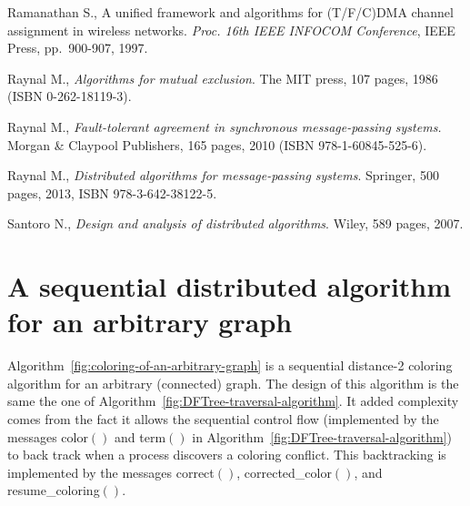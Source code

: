\documentclass[11pt,english]{article}
\begin{document}
\begin{thebibliography}{99}
{\vspace{-0.1cm}
Ramanathan S.,
A unified framework and algorithms for (T/F/C)DMA channel assignment in 
wireless networks.
{\it Proc. 16th IEEE INFOCOM Conference}, IEEE Press, pp.~900-907, 1997.



\vspace{-0.1cm}
Raynal M., 
{\it Algorithms for mutual exclusion}. 
The MIT press, 107 pages, 1986 (ISBN 0-262-18119-3). 

\vspace{-0.1cm}
Raynal M., 
{\it Fault-tolerant agreement  in synchronous message-passing  systems.}
Morgan \& Claypool Publishers,  165  pages, 2010
(ISBN 978-1-60845-525-6). 

\vspace{-0.1cm}
Raynal M., 
{\it Distributed algorithms for message-passing systems}.
Springer, 500 pages, 2013, ISBN 978-3-642-38122-5.


\vspace{-0.1cm}
Santoro N., 
{\it Design and analysis of distributed algorithms}. 
Wiley, 589 pages, 2007. 

}
\end{thebibliography}



\appendix 
\section{A sequential distributed algorithm for an arbitrary graph}
\label{sec:seq-arbitrary-graph}

Algorithm~\ref{fig:coloring-of-an-arbitrary-graph} is a sequential 
distance-2 coloring algorithm 
for an  arbitrary (connected) graph. The design of this algorithm 
is the same the one of  Algorithm~\ref{fig:DFTree-traversal-algorithm}.
It added complexity comes from the fact it allows the sequential control flow
(implemented by the messages {\sc color}$()$ and {\sc term}$()$
in Algorithm~\ref{fig:DFTree-traversal-algorithm})
to back track when a process discovers  a  coloring conflict.  
This backtracking is implemented by the messages  {\sc correct}$()$,
{\sc corrected\_color}$()$, and {\sc resume\_coloring}$()$.
\end{document}
